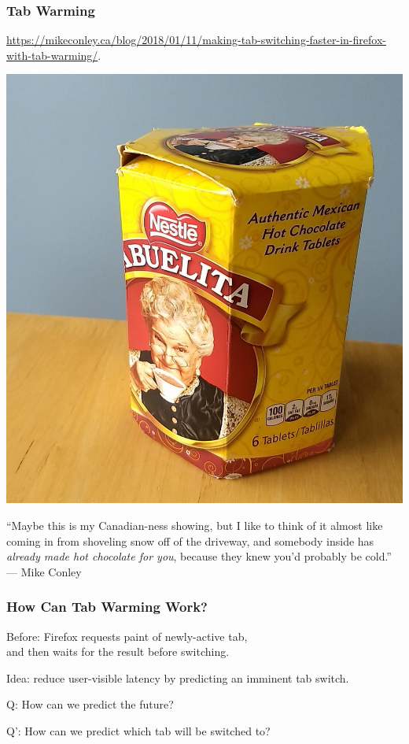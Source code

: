 \begin{frame}
\frametitle{Tab Warming}
\begin{center}
\url{https://mikeconley.ca/blog/2018/01/11/making-tab-switching-faster-in-firefox-with-tab-warming/}.
\end{center}

\begin{minipage}[t]{.5\textwidth}
\vspace{0pt}
\includegraphics[width=.95\columnwidth]{images/L19-hot-chocolate.jpg}
\end{minipage}%
\begin{minipage}[t]{.5\textwidth}
\vspace{3em}
``Maybe this is my Canadian-ness showing, but I like to think of it almost like coming in from shoveling snow off of the driveway, and somebody inside has \emph{already made hot chocolate for you}, because they knew you’d probably be cold.'' --- Mike Conley
\end{minipage}

\end{frame}

\begin{frame}
\frametitle{How Can Tab Warming Work?}
\Large

Before: Firefox requests paint of newly-active tab,\\
and then waits for the result before switching.

Idea: reduce user-visible latency by predicting an imminent tab switch.

Q: How can we predict the future?

Q': How can we predict which tab will be switched to?

\end{frame}

